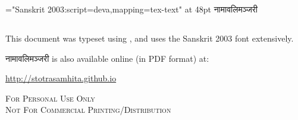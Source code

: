 \thispagestyle{empty}

\begin{titlepage}
\vspace*{6.5cm}\centerline{\font\x="Sanskrit 2003:script=deva,mapping=tex-text" at 48pt \x नामावलिमञ्जरी}
\end{titlepage}
\vspace*{5cm}
\begin{center}

\parbox{10cm}{\subsection*{}
\noindent {} This document was typeset using \XeLaTeX, and uses the Sanskrit 2003 font extensively.


\begin{center}
{ नामावलिमञ्जरी} is also available online (in PDF format) at: 

\url{http://stotrasamhita.github.io}




\vspace*{1cm}

{\scshape{For Personal Use Only\\
 Not For Commercial Printing/Distribution}}
\end{center}
}
\end{center}
\clearemptydoublepage
\setcounter{page}{0}
\renewcommand{\chaptermark}[1]{%
\markboth{#1}{}}
\begin{center}
\begin{large}
\tableofcontents
\end{large}
\end{center}

\mbox{}
\clearpage
